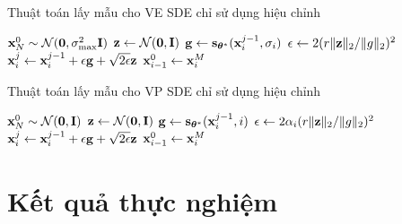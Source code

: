 \documentclass[10pt]{beamer}
\theoremstyle{remark}
\numberwithin{algocf}{section}
\numberwithin{equation}{section}
\numberwithin{dl}{section}
\numberwithin{figure}{section}
\begin{document}
\begin{frame}{Thuật toán lấy mẫu cho VE SDE chỉ sử dụng hiệu chỉnh}
	\begin{algorithm}[H]
		\DontPrintSemicolon
		$\bold{x}_N^0 \sim \mathcal{N}(\bold{0}, \sigma_{\max}^2 \bold{I})$\;
		 {
			 {
				$\bold{z} \gets  \mathcal{N}(\bold{0}, \bold{I})$\;
				$\bold{g} \gets \bold{s}_{\boldsymbol{\theta}^{\ast}}(\bold{x}_i^{j-1}, \sigma_i)$\;
				$\epsilon \gets 2 (r \lVert \bold{z} \rVert_2 / \lVert g \rVert_2)^2$\;
				$\bold{x}_i^j \gets \bold{x}_i^{j-1} + \epsilon \bold{g} + \sqrt{2 \epsilon} \bold{z}$\;
			}
			$\bold{x}_{i-1}^0 \gets \bold{x}_i^M$\;
		}
		\;
		\caption{Thuật toán hiệu chỉnh (VE SDE)}
		\label{alg:4}
	\end{algorithm}
\end{frame}

\begin{frame}{Thuật toán lấy mẫu cho VP SDE chỉ sử dụng hiệu chỉnh}
	\begin{algorithm}[H]
		\DontPrintSemicolon
		$\bold{x}_N^0 \sim \mathcal{N}(\bold{0}, \bold{I})$\;
		 {
			 {
				$\bold{z} \gets  \mathcal{N}(\bold{0}, \bold{I})$\;
				$\bold{g} \gets \bold{s}_{\boldsymbol{\theta}^{\ast}}(\bold{x}_i^{j-1}, i)$\;
				$\epsilon \gets 2 \alpha_i (r \lVert \bold{z} \rVert_2 / \lVert g \rVert_2)^2$\;
				$\bold{x}_i^j \gets \bold{x}_i^{j-1} + \epsilon \bold{g} + \sqrt{2 \epsilon} \bold{z}$\;
			}
			$\bold{x}_{i-1}^0 \gets \bold{x}_i^M$\;
		}
		\;
		\caption{Thuật toán hiệu chỉnh (VP SDE)}
		\label{alg:5}
	\end{algorithm}
\end{frame}

\section{Kết quả thực nghiệm}
\end{document}
